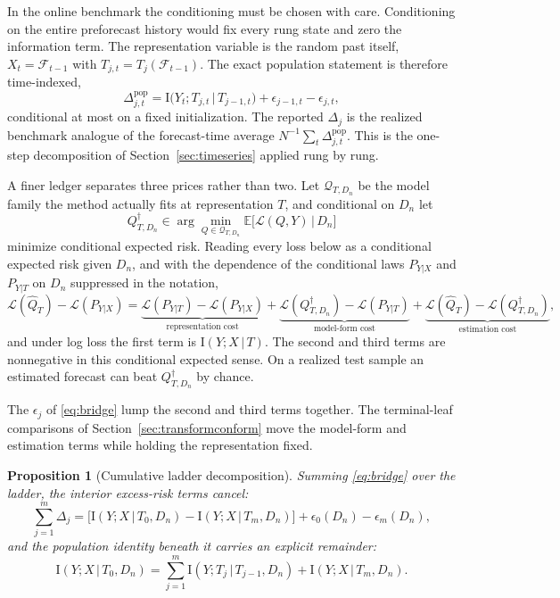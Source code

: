 \documentclass[11pt]{article}
\newtheorem{proposition}[theorem]{Proposition}
\theoremstyle{remark}
\newcommand{\E}{\mathbb{E}}
\newcommand{\I}{\mathrm{I}}
\newcommand{\given}{\,|\,}
\newcommand{\F}{\mathcal{F}}
\newcommand{\Dn}{D_n}
\newcommand{\Loss}{\mathcal{L}}
\begin{document}
In the online benchmark the conditioning must be chosen with care. Conditioning on the entire
preforecast history would fix every rung state and zero the information term. The
representation variable is the random past itself, $X_t=\F_{t-1}$ with
$T_{j,t}=T_j(\F_{t-1})$. The exact population statement is therefore time-indexed,
\[
\Delta^{\mathrm{pop}}_{j,t}
=\I\big(Y_t;T_{j,t}\given T_{j-1,t}\big)+\epsilon_{j-1,t}-\epsilon_{j,t},
\]
conditional at most on a fixed initialization. The reported $\Delta_j$ is the realized
benchmark analogue of the forecast-time average
$N^{-1}\sum_t\Delta^{\mathrm{pop}}_{j,t}$. This is the one-step decomposition of
Section~\ref{sec:timeseries} applied rung by rung.

A finer ledger separates three prices rather than two. Let $\mathcal Q_{T,\Dn}$ be the
model family the method actually fits at representation $T$, and conditional on $\Dn$ let
\[
Q^\dagger_{T,\Dn}\in\arg\min_{Q\in\mathcal Q_{T,\Dn}}\E\big[\Loss(Q,Y)\given\Dn\big]
\]
minimize conditional expected risk. Reading every loss below as a conditional expected risk
given $\Dn$, and with the dependence of the conditional laws $P_{Y|X}$ and $P_{Y|T}$ on
$\Dn$ suppressed in the notation,
\[
\Loss(\widehat Q_T)-\Loss(P_{Y|X})
=\underbrace{\Loss(P_{Y|T})-\Loss(P_{Y|X})}_{\text{representation cost}}
+\underbrace{\Loss(Q^\dagger_{T,\Dn})-\Loss(P_{Y|T})}_{\text{model-form cost}}
+\underbrace{\Loss(\widehat Q_T)-\Loss(Q^\dagger_{T,\Dn})}_{\text{estimation cost}},
\]
and under log loss the first term is $\I(Y;X\given T)$. The second and third terms are
nonnegative in this conditional expected sense. On a realized test sample an estimated
forecast can beat $Q^\dagger_{T,\Dn}$ by chance.

The $\epsilon_j$ of \eqref{eq:bridge} lump
the second and third terms together. The terminal-leaf comparisons of
Section~\ref{sec:transformconform} move the model-form and estimation terms while holding
the representation fixed.

\begin{proposition}[Cumulative ladder decomposition]\label{prop:cumulative}
Summing \eqref{eq:bridge} over the ladder, the interior excess-risk terms cancel:
\begin{equation}\label{eq:cumulative}
\sum_{j=1}^m\Delta_j
=\big[\I(Y;X\given T_0,\Dn)-\I(Y;X\given T_m,\Dn)\big]+\epsilon_0(\Dn)-\epsilon_m(\Dn),
\end{equation}
and the population identity beneath it carries an explicit remainder:
\begin{equation}\label{eq:remainder}
\I(Y;X\given T_0,\Dn)=\sum_{j=1}^m\I(Y;T_j\given T_{j-1},\Dn)+\I(Y;X\given T_m,\Dn).
\end{equation}
\end{proposition}
\end{document}
